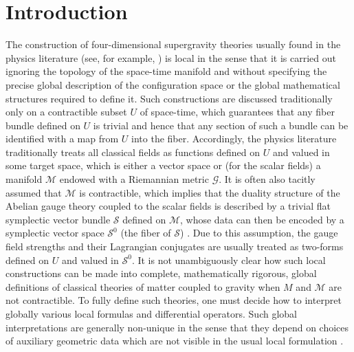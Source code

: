 \documentclass[10pt, cmp, numbook, final, a4paper]{svjour}
\newcommand{\cM}{\mathcal{M}}
\def\cG{\mathcal{G}}
\def\cS{\mathcal{S}}
\begin{document}
\tableofcontents

\section{Introduction}

The construction of four-dimensional supergravity theories usually
found in the physics literature (see, for example,
\cite{Andrianopoli,AndrianopoliII,AndrianopoliIII,Aschieri}) is 
local in the sense that it is carried out ignoring the topology of the space-time
manifold and without specifying the precise global description of the
configuration space or the global mathematical structures required to
define it. Such constructions are discussed traditionally only on a
contractible subset $U$ of space-time, which guarantees that any fiber
bundle defined on $U$ is trivial and hence that any section of such a
bundle can be identified with a map from $U$ into the
fiber. Accordingly, the physics literature traditionally treats all
classical fields as functions defined on $U$ and valued in some target
space, which is either a vector space or (for the scalar fields) a
manifold $\cM$ endowed with a Riemannian metric $\cG$. It is often
also tacitly assumed that $\cM$ is contractible, which implies that
the duality structure \cite{GESM,GESMNote} of the Abelian gauge theory
coupled to the scalar fields is described by a trivial flat symplectic
vector bundle $\cS$ defined on $\cM$, whose data can then be encoded
by a symplectic vector space $\cS^0$ (the fiber of $\cS$)
\cite{AndrianopoliII,AndrianopoliIII}. Due to this assumption, the
gauge field strengths and their Lagrangian conjugates are usually
treated as two-forms defined on $U$ and valued in $\cS^0$. It is not
unambiguously clear how such local constructions can be made into
complete, mathematically rigorous, global definitions of classical
theories of matter coupled to gravity when $M$ and $\cM$ are not
contractible. To fully define such theories, one must decide how to
interpret globally various local formulas and differential operators.
Such global interpretations are generally non-unique in the sense
that they depend on choices of auxiliary geometric data
which are not visible in the usual local formulation
\cite{GESM,GESMNote,GeometricUfolds}.
\end{document}
